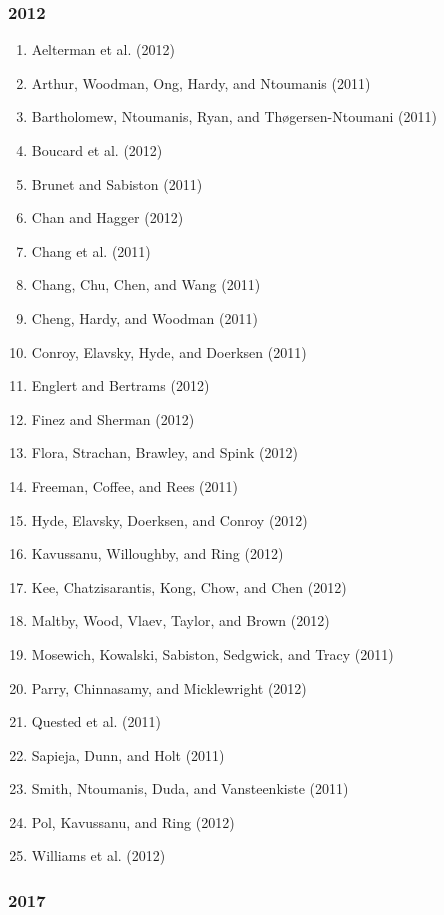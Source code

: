 \documentclass[english,man]{apa6}
\providecommand{\tightlist}{%
  \setlength{\itemsep}{0pt}\setlength{\parskip}{0pt}}
\theoremstyle{definition}
\theoremstyle{definition}
\theoremstyle{definition}
\theoremstyle{remark}
\begin{document}
\subsubsection{2012}\label{section-50}

\begin{enumerate}
\def\labelenumi{\arabic{enumi})}
\tightlist
\item
  Aelterman et al. (2012)
\item
  Arthur, Woodman, Ong, Hardy, and Ntoumanis (2011)
\item
  Bartholomew, Ntoumanis, Ryan, and Thøgersen-Ntoumani (2011)
\item
  Boucard et al. (2012)
\item
  Brunet and Sabiston (2011)
\item
  Chan and Hagger (2012)
\item
  Chang et al. (2011)
\item
  Chang, Chu, Chen, and Wang (2011)
\item
  Cheng, Hardy, and Woodman (2011)
\item
  Conroy, Elavsky, Hyde, and Doerksen (2011)
\item
  Englert and Bertrams (2012)
\item
  Finez and Sherman (2012)
\item
  Flora, Strachan, Brawley, and Spink (2012)
\item
  Freeman, Coffee, and Rees (2011)
\item
  Hyde, Elavsky, Doerksen, and Conroy (2012)
\item
  Kavussanu, Willoughby, and Ring (2012)
\item
  Kee, Chatzisarantis, Kong, Chow, and Chen (2012)
\item
  Maltby, Wood, Vlaev, Taylor, and Brown (2012)
\item
  Mosewich, Kowalski, Sabiston, Sedgwick, and Tracy (2011)
\item
  Parry, Chinnasamy, and Micklewright (2012)
\item
  Quested et al. (2011)
\item
  Sapieja, Dunn, and Holt (2011)
\item
  Smith, Ntoumanis, Duda, and Vansteenkiste (2011)
\item
  Pol, Kavussanu, and Ring (2012)
\item
  Williams et al. (2012)
\end{enumerate}

\subsubsection{2017}\label{section-51}
\end{document}
